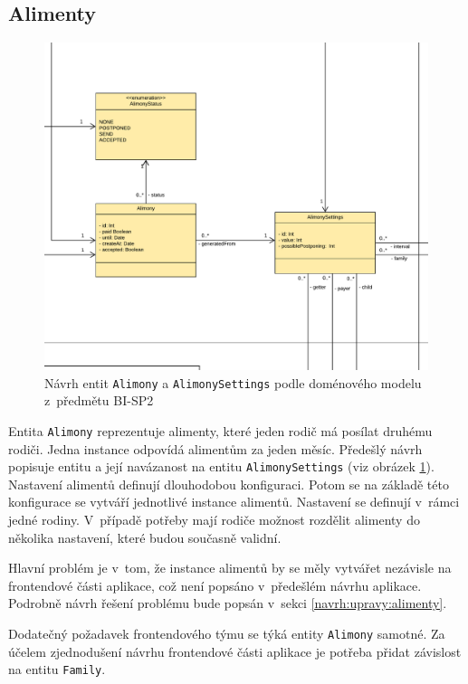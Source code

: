     \subsection{Alimenty}
        \begin{figure}\centering
	        \includegraphics[width=1.0\textwidth]{pdfs/AlimonyDraft1}
	        \caption[Návrh entit \texttt{Alimony} a \texttt{AlimonySettings}]{Návrh entit \texttt{Alimony} a \texttt{AlimonySettings} podle doménového modelu z~předmětu BI-SP2}\label{image:aliomny-draft1}
        \end{figure}
        Entita \verb|Alimony| reprezentuje alimenty, které jeden rodič má posílat druhému rodiči. Jedna instance odpovídá alimentům za jeden měsíc. Předešlý návrh popisuje entitu a její navázanost na entitu \verb|AlimonySettings| (viz obrázek \ref{image:aliomny-draft1}). Nastavení alimentů definují dlouhodobou konfiguraci. Potom se na základě této konfigurace se vytváří jednotlivé instance alimentů. Nastavení se definují v~rámci jedné rodiny. V~případě potřeby mají rodiče možnost rozdělit alimenty do několika nastavení, které budou současně validní.
        
        Hlavní problém je v~tom, že instance alimentů by se měly vytvářet nezávisle na frontendové části aplikace, což není popsáno v~předešlém návrhu aplikace. Podrobně návrh řešení problému bude popsán v~sekci \ref{navrh:upravy:alimenty}.
        
        Dodatečný požadavek frontendového týmu se týká entity \texttt{Alimony} samotné. Za účelem zjednodušení návrhu frontendové části aplikace je potřeba přidat závislost na entitu \texttt{Family}. %
        
